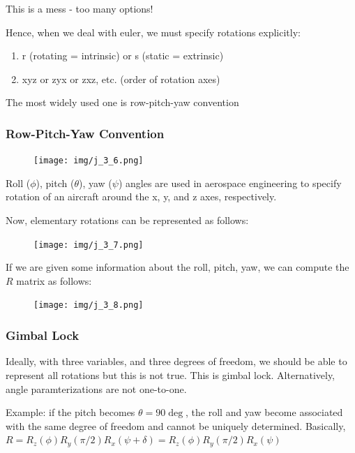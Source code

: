 This is a mess - too many options!

Hence, when we deal with euler, we must specify rotations explicitly:

\begin{enumerate}
    \item r (rotating = intrinsic) or s (static = extrinsic)
    \item xyz or zyx or zxz, etc. (order of rotation axes)
\end{enumerate}

The most widely used one is row-pitch-yaw convention

\subsubsection{Row-Pitch-Yaw Convention}

\begin{figure}[h]\centering\texttt{[image: img/j\_3\_6.png]}\end{figure}

Roll ($\phi$), pitch ($\theta$), yaw ($\psi$) angles are used in aerospace engineering to specify rotation of an aircraft around the x, y, and z axes, respectively.

Now, elementary rotations can be represented as follows:

\begin{figure}[h]\centering\texttt{[image: img/j\_3\_7.png]}\end{figure}

If we are given some information about the roll, pitch, yaw, we can compute the $R$ matrix as follows: \clearpage

\begin{figure}[h]\centering\texttt{[image: img/j\_3\_8.png]}\end{figure}

\subsubsection{Gimbal Lock}

Ideally, with three variables, and three degrees of freedom, we should be able to represent all rotations but this is not true. This is gimbal lock. Alternatively, angle paramterizations are not one-to-one.

Example: if the pitch becomes $\theta = 90\deg$, the roll and yaw become associated with the same degree of freedom and cannot be uniquely determined. Basically, $R = R_z(\phi)R_y(\pi/2)R_x(\psi + \delta) = R_z(\phi)R_y(\pi/2)R_x(\psi)$

